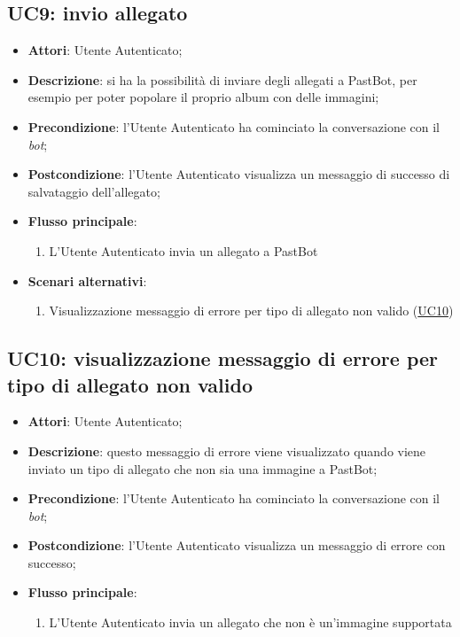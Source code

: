 
\subsection{UC9: invio allegato}
\label{uc:uc9}
\hypertarget{UC9}{}

\begin{itemize}
  \item \textbf{Attori}: Utente Autenticato;
  \item \textbf{Descrizione}: si ha la possibilità di inviare degli allegati a
PastBot, per esempio per poter popolare il proprio album con delle immagini;
  \item \textbf{Precondizione}: l'Utente Autenticato ha cominciato la
conversazione con il \textit{bot};
  \item \textbf{Postcondizione}: l'Utente Autenticato visualizza un messaggio
di successo di salvataggio dell'allegato;
  \item \textbf{Flusso principale}:
  \begin{enumerate}
    \item L'Utente Autenticato invia un allegato a PastBot
  \end{enumerate}
  \item \textbf{Scenari alternativi}:
  \begin{enumerate}
    \item Visualizzazione messaggio di errore per tipo di allegato non valido
(\hyperlink{UC10}{UC10})
  \end{enumerate}
\end{itemize}



\subsection{UC10: visualizzazione messaggio di errore per tipo di allegato non
valido}
\label{uc:uc10}
\hypertarget{UC10}{}

\begin{itemize}
  \item \textbf{Attori}: Utente Autenticato;
  \item \textbf{Descrizione}: questo messaggio di errore viene visualizzato
quando viene inviato un tipo di allegato che non sia una immagine a PastBot;
  \item \textbf{Precondizione}: l'Utente Autenticato ha cominciato la
conversazione con il \textit{bot};
  \item \textbf{Postcondizione}: l'Utente Autenticato visualizza un messaggio
di errore con successo;
  \item \textbf{Flusso principale}:
  \begin{enumerate}
    \item L'Utente Autenticato invia un allegato che non è un'immagine
supportata
  \end{enumerate}
\end{itemize}


